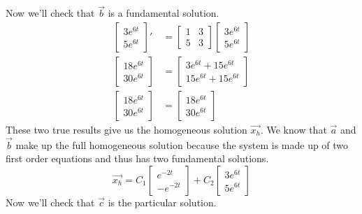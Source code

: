 Now we'll check that $\vec{b}$ is a fundamental solution.
\begin{align*}
	\begin{bmatrix}
		3e^{6t} \\
		5e^{6t}
	\end{bmatrix}' &= \begin{bmatrix}
		1 & 3 \\
		5 & 3
	\end{bmatrix} \begin{bmatrix}
		3e^{6t} \\
		5e^{6t}
	\end{bmatrix} \\
	\begin{bmatrix}
		18e^{6t} \\
		30e^{6t}
	\end{bmatrix} &= \begin{bmatrix}
		3e^{6t} + 15e^{6t} \\
		15e^{6t} + 15e^{6t}
	\end{bmatrix} \\
	\begin{bmatrix}
		18e^{6t} \\
		30e^{6t}
	\end{bmatrix} &= \begin{bmatrix}
		18e^{6t} \\
		30e^{6t}
	\end{bmatrix}
\end{align*}
These two true results give us the homogeneous solution $\vec{x_h}$.
We know that $\vec{a}$ and $\vec{b}$ make up the full homogeneous solution because the system is made up of two first order equations and thus has two fundamental solutions.
\begin{equation*}
	\vec{x_h} = C_1\begin{bmatrix}
		e^{-2t} \\
		-e^{-2t}
	\end{bmatrix} + C_2\begin{bmatrix}
		3e^{6t} \\
		5e^{6t}
	\end{bmatrix}
\end{equation*}
Now we'll check that $\vec{c}$ is the particular solution.
